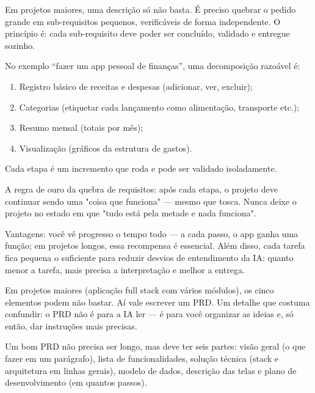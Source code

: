 Em projetos maiores, uma descrição só não basta. É preciso quebrar o pedido grande em sub-requisitos pequenos, verificáveis de forma independente. O princípio é: cada sub-requisito deve poder ser concluído, validado e entregue sozinho.

No exemplo “fazer um app pessoal de finanças”, uma decomposição razoável é:

\begin{enumerate}
  \item Registro básico de receitas e despesas (adicionar, ver, excluir);
  \item Categorias (etiquetar cada lançamento como alimentação, transporte etc.);
  \item Resumo mensal (totais por mês);
  \item Visualização (gráficos da estrutura de gastos).
\end{enumerate}

Cada etapa é um incremento que roda e pode ser validado isoladamente.

A regra de ouro da quebra de requisitos: após cada etapa, o projeto deve continuar sendo uma "coisa que funciona" — mesmo que tosca. Nunca deixe o projeto no estado em que "tudo está pela metade e nada funciona".

Vantagens: você vê progresso o tempo todo — a cada passo, o app ganha uma função; em projetos longos, essa recompensa é essencial. Além disso, cada tarefa fica pequena o suficiente para reduzir desvios de entendimento da IA: quanto menor a tarefa, mais precisa a interpretação e melhor a entrega.


Em projetos maiores (aplicação full stack com vários módulos), os cinco elementos podem não bastar. Aí vale escrever um PRD. Um detalhe que costuma confundir: o PRD não é para a IA ler — é para você organizar as ideias e, só então, dar instruções mais precisas.

Um bom PRD não precisa ser longo, mas deve ter seis partes: visão geral (o que fazer em um parágrafo), lista de funcionalidades, solução técnica (stack e arquitetura em linhas gerais), modelo de dados, descrição das telas e plano de desenvolvimento (em quantos passos).

